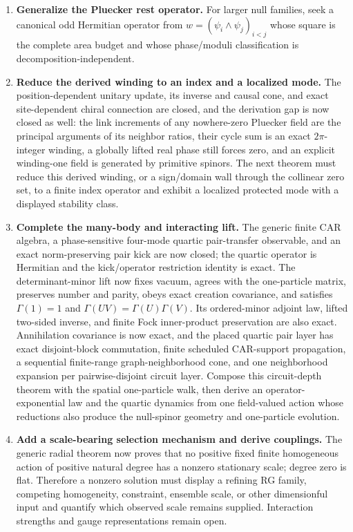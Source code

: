 \documentclass[11pt]{article}
\begin{document}
\begin{enumerate}[leftmargin=2em]
  cell and audit its corners, bands, and locality radius.  Constant onsite
  equivalence is already constrained by the alias-preservation no-go; a
  genuine comparison must specify any blocking or coarse-graining map.
  \item \textbf{Generalize the Pluecker rest operator.}
  For larger null families, seek a canonical odd Hermitian operator from
  $w=(\psi_i\wedge\psi_j)_{i<j}$ whose square is the complete area budget and
  whose phase/moduli classification is decomposition-independent.
  \item \textbf{Reduce the derived winding to an index and a localized mode.}
  The position-dependent unitary update, its inverse and causal cone, and exact
  site-dependent chiral connection are closed, and the derivation gap is now
  closed as well: the link increments of any nowhere-zero Pluecker field are
  the principal arguments of its neighbor ratios, their cycle sum is an exact
  $2\pi$-integer winding, a globally lifted real phase still forces zero, and
  an explicit winding-one field is generated by primitive spinors.  The next
  theorem must reduce this derived winding, or a sign/domain wall through the
  collinear zero set, to a finite index operator and exhibit a localized
  protected mode with a displayed stability class.
  \item \textbf{Complete the many-body and interacting lift.}
  The generic finite CAR algebra, a phase-sensitive four-mode quartic
  pair-transfer observable, and an exact norm-preserving pair kick are now
  closed; the quartic operator is Hermitian and the kick/operator restriction
  identity is exact.  The determinant-minor lift now fixes vacuum, agrees with
  the one-particle matrix, preserves number and parity, obeys exact creation
  covariance, and satisfies $\Gamma(1)=1$ and
  $\Gamma(UV)=\Gamma(U)\Gamma(V)$.  Its ordered-minor adjoint law, lifted
  two-sided inverse, and finite Fock inner-product preservation are also exact.
  Annihilation covariance is now exact, and the placed quartic pair layer has
  exact disjoint-block commutation, finite scheduled CAR-support propagation,
  a sequential finite-range graph-neighborhood cone, and one neighborhood
  expansion per pairwise-disjoint circuit layer.  Compose this circuit-depth
  theorem with the spatial one-particle walk, then derive an
  operator-exponential law and the quartic dynamics from one
  field-valued action whose reductions also produce the null-spinor geometry
  and one-particle evolution.
  \item \textbf{Add a scale-bearing selection mechanism and derive couplings.}
  The generic radial theorem now proves that no positive fixed finite
  homogeneous action of positive natural degree has a nonzero stationary
  scale; degree zero is flat.  Therefore a nonzero solution must display a
  refining RG family, competing homogeneity, constraint, ensemble scale, or
  other dimensionful input and quantify which observed scale remains supplied.
  Interaction strengths and gauge representations remain open.
\end{enumerate}
\end{document}
